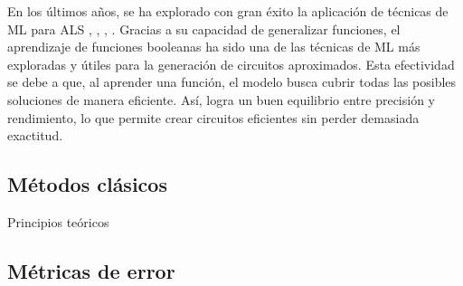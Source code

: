 En los últimos años, se ha explorado con gran éxito la aplicación de técnicas
de ML para ALS
\cite{pasandi_approximate_2019}, \cite{rai_logic_2021},
\cite{berndt_review_2022}, \cite{prats_ramos_impact_2024}.
Gracias a su capacidad de generalizar funciones, el aprendizaje de funciones
booleanas ha sido una de las técnicas de ML más exploradas y útiles para la
generación de circuitos aproximados. Esta efectividad se debe a que, al
aprender una función, el modelo busca cubrir todas las posibles soluciones de
manera eficiente. Así, logra un buen equilibrio entre precisión y rendimiento,
lo que permite crear circuitos eficientes sin perder demasiada exactitud.

\subsection{Métodos clásicos}

Principios teóricos

\subsection{Métricas de error}
